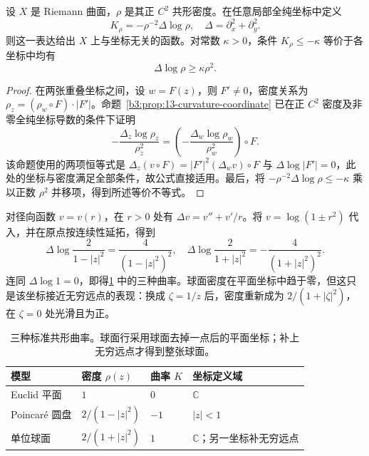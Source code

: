 \begin{proposition}\label{b3:prop:14-curvature-formula}
设 \(X\) 是 Riemann 曲面，\(\rho\) 是其正 \(C^2\) 共形密度。在任意局部全纯坐标中定义
\[
 K_\rho=-\rho^{-2}\Delta\log\rho,
 \quad \Delta=\partial_x^2+\partial_y^2.
\]
则这一表达给出 \(X\) 上与坐标无关的函数。对常数 \(\kappa>0\)，条件 \(K_\rho\le-\kappa\) 等价于各坐标中均有
\[
 \Delta\log\rho\ge\kappa\rho^2.
\]
\end{proposition}
\begin{proof}
在两张重叠坐标之间，设 \(w=F(z)\)，则 \(F'\ne0\)，密度关系为 \(\rho_z=(\rho_w\circ F)\cdot|F'|\)。命题~\ref{b3:prop:13-curvature-coordinate} 已在正 \(C^2\) 密度及非零全纯坐标导数的条件下证明
\[
 -\frac{\Delta_z\log\rho_z}{\rho_z^2}
 =\left(-\frac{\Delta_w\log\rho_w}{\rho_w^2}\right)\circ F.
\]
该命题使用的两项恒等式是 \(\Delta_z(v\circ F)=|F'|^2(\Delta_wv)\circ F\) 与 \(\Delta\log|F'|=0\)，此处的坐标与密度满足全部条件，故公式直接适用。最后，将 \(-\rho^{-2}\Delta\log\rho\le-\kappa\) 乘以正数 \(\rho^2\) 并移项，得到所述等价不等式。
\end{proof}

对径向函数 \(v=v(r)\)，在 \(r>0\) 处有 \(\Delta v=v''+v'/r\)。将 \(v=\log(1\pm r^2)\) 代入，并在原点按连续性延拓，得到
\[
 \Delta\log\frac{2}{1-|z|^2}
 =\frac{4}{(1-|z|^2)^2},
 \quad
 \Delta\log\frac{2}{1+|z|^2}
 =-\frac{4}{(1+|z|^2)^2}.
\]
连同 \(\Delta\log1=0\)，即得\cref{b3:tab:14-curvature-models} 中的三种曲率。球面密度在平面坐标中趋于零，但这只是该坐标接近无穷远点的表现：换成 \(\zeta=1/z\) 后，密度重新成为 \(2/(1+|\zeta|^2)\)，在 \(\zeta=0\) 处光滑且为正。

\begin{table}[htbp]
\centering\small\renewcommand{\arraystretch}{1.18}\setlength{\tabcolsep}{4pt}
\caption[三种标准共形曲率]{三种标准共形曲率。球面行采用球面去掉一点后的平面坐标；补上无穷远点才得到整张球面。}
\label{b3:tab:14-curvature-models}
\begin{tabularx}{\linewidth}{@{}>{\raggedright\arraybackslash}p{2cm}>{\centering\arraybackslash}p{3.3cm}>{\centering\arraybackslash}p{1.3cm}>{\raggedright\arraybackslash}X@{}}
\toprule
模型 & 密度 \(\rho(z)\) & 曲率 \(K\) & 坐标定义域 \\
\midrule
Euclid 平面 & \(1\) & \(0\) & \(\mathbb C\) \\
Poincaré 圆盘 & \(2/(1-|z|^2)\) & \(-1\) & \(|z|<1\) \\
单位球面 & \(2/(1+|z|^2)\) & \(1\) & \(\mathbb C\)；另一坐标补无穷远点 \\
\bottomrule
\end{tabularx}
\end{table}

